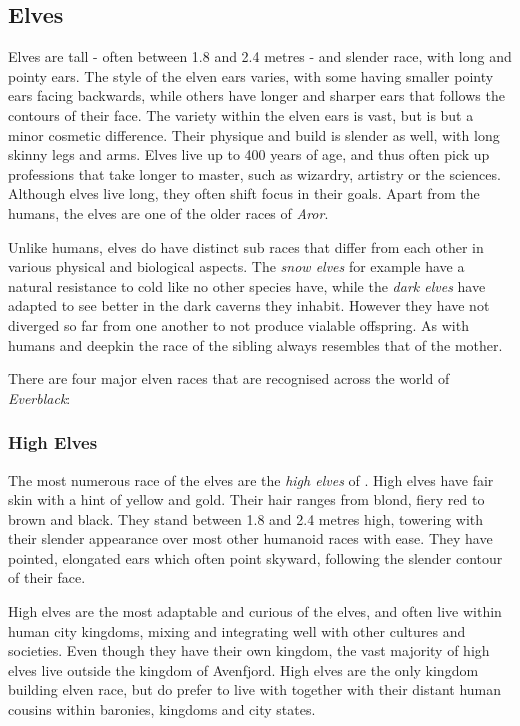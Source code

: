 \subsection{Elves}
\label{sec:Elves}

Elves are tall - often between 1.8 and 2.4 metres - and slender race, with
long and pointy ears. The style of the elven ears varies, with some having
smaller pointy ears facing backwards, while others have longer and sharper
ears that follows the contours of their face. The variety within the elven
ears is vast, but is but a minor cosmetic difference. Their physique and build
is slender as well, with long skinny legs and arms. Elves live up to 400 years
of age, and thus often pick up professions that take longer to master, such as
wizardry, artistry or the sciences. Although elves live long, they often shift
focus in their goals. Apart from the humans, the elves are one of the older
races of \emph{Aror}.

Unlike humans, elves do have distinct sub races that differ from each other in
various physical and biological aspects. The \emph{snow elves} for example
have a natural resistance to cold like no other species have, while the
\emph{dark elves} have adapted to see better in the dark caverns they
inhabit. However they have not diverged so far from one another to not produce
vialable offspring. As with humans and deepkin the race of the sibling always
resembles that of the mother.

There are four major elven races that are recognised across the world of
\emph{Everblack}:

\subsubsection{High Elves}
\label{sec:High Elves}

The most numerous race of the elves are the \emph{high elves} of
. High elves have fair skin with a hint of yellow and
gold. Their hair ranges from blond, fiery red to brown and black. They stand
between 1.8 and 2.4 metres high, towering with their slender appearance over
most other humanoid races with ease. They have pointed, elongated ears which
often point skyward, following the slender contour of their face.

High elves are the most adaptable and curious of the elves, and often live
within human city kingdoms, mixing and integrating well with other cultures
and societies. Even though they have their own kingdom, the vast majority of
high elves live outside the kingdom of Avenfjord. High elves are the only
kingdom building elven race, but do prefer to live with together with their
distant human cousins within baronies, kingdoms and city states.

